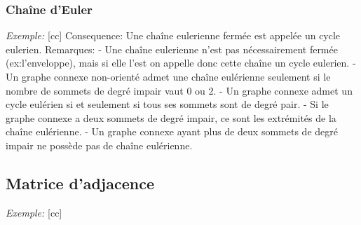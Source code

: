 \documentclass[12pt]{article}
\begin{document}
        \subsubsection{Chaîne d'Euler}
            \textit{Exemple:}
            [cc]
            Consequence:
            Une chaîne eulerienne fermée est appelée un cycle eulerien.
            Remarques:
            - Une chaîne eulerienne n'est pas nécessairement fermée (ex:l'enveloppe), mais si elle l'est on appelle donc cette chaîne un cycle eulerien.
            - Un graphe connexe non-orienté admet une chaîne eulérienne seulement si le nombre de sommets de degré impair vaut 0 ou 2.
            - Un graphe connexe admet un cycle eulérien si et seulement si tous ses sommets sont de degré pair.
            - Si le graphe connexe a deux sommets de degré impair, ce sont les extrémités de la chaîne eulérienne.
            - Un graphe connexe ayant plus de deux sommets de degré impair ne possède pas de chaîne eulérienne.

    \subsection{Matrice d'adjacence}
        \textit{Exemple:}
        [cc]

    \egroup
\end{document}
